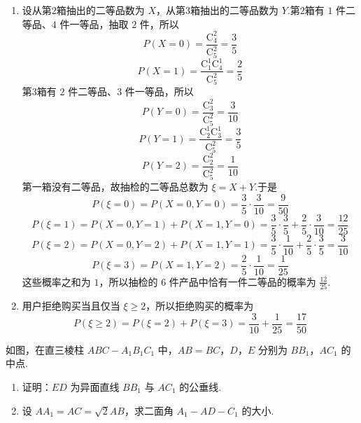 \begin{solution}
\begin{enumerate}
\item 设从第\(2\)箱抽出的二等品数为 \(X\)，从第\(3\)箱抽出的二等品数为 \(Y\).第\(2\)箱有 \(1\text{ 件}\)二等品、\(4\text{ 件}\)一等品，抽取 \(2\text{ 件}\)，所以
\[
P(X=0)=\frac{\mathrm C_{4}^{2}}{\mathrm C_{5}^{2}}=\frac35
\]
\[
P(X=1)=\frac{\mathrm C_{1}^{1}\mathrm C_{4}^{1}}{\mathrm C_{5}^{2}}=\frac25
\]
第\(3\)箱有 \(2\text{ 件}\)二等品、\(3\text{ 件}\)一等品，所以
\[
P(Y=0)=\frac{\mathrm C_{3}^{2}}{\mathrm C_{5}^{2}}=\frac3{10}
\]
\[
P(Y=1)=\frac{\mathrm C_{2}^{1}\mathrm C_{3}^{1}}{\mathrm C_{5}^{2}}=\frac35
\]
\[
P(Y=2)=\frac{\mathrm C_{2}^{2}}{\mathrm C_{5}^{2}}=\frac1{10}
\]
第一箱没有二等品，故抽检的二等品总数为 \(\xi=X+Y\).于是
\[
P(\xi=0)=P(X=0,Y=0)=\frac35\cdot\frac3{10}=\frac9{50}
\]
\[
P(\xi=1)=P(X=0,Y=1)+P(X=1,Y=0)
=\frac35\cdot\frac35+\frac25\cdot\frac3{10}=\frac{12}{25}
\]
\[
P(\xi=2)=P(X=0,Y=2)+P(X=1,Y=1)
=\frac35\cdot\frac1{10}+\frac25\cdot\frac35=\frac3{10}
\]
\[
P(\xi=3)=P(X=1,Y=2)=\frac25\cdot\frac1{10}=\frac1{25}
\]
这些概率之和为 \(1\)，所以抽检的 \(6\text{ 件}\)产品中恰有一件二等品的概率为 \(\frac{12}{25}\).

\item 用户拒绝购买当且仅当 \(\xi\ge2\)，所以拒绝购买的概率为
\[
P(\xi\ge2)=P(\xi=2)+P(\xi=3)=\frac3{10}+\frac1{25}=\frac{17}{50}
\]
\end{enumerate}
\end{solution}

\begin{problem}
如图，在直三棱柱 \(ABC - A_{1}B_{1}C_{1}\) 中，\(AB = BC\)，\(D\)，\(E\) 分别为 \(BB_{1}\)，\(AC_{1}\) 的中点.

\begin{enumerate}
\item 证明：\(ED\) 为异面直线 \(BB_{1}\) 与 \(AC_{1}\) 的公垂线.
\item 设 \(AA_{1} = AC = \sqrt{2} AB\)，求二面角 \(A_{1} - AD - C_{1}\) 的大小.
\end{enumerate}

\end{problem}


